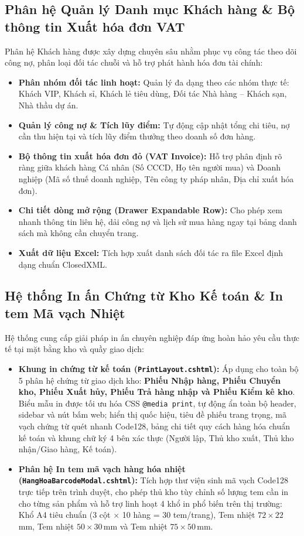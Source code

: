 \documentclass[12pt,a4paper]{report}
\renewcommand{\_}{\textunderscore\allowbreak}
\begin{document}
\subsection{Phân hệ Quản lý Danh mục Khách hàng \& Bộ thông tin Xuất hóa đơn VAT}
Phân hệ Khách hàng được xây dựng chuyên sâu nhằm phục vụ công tác theo dõi công nợ, phân loại đối tác chuỗi và hỗ trợ phát hành hóa đơn tài chính:
\begin{itemize}
    \item \textbf{Phân nhóm đối tác linh hoạt:} Quản lý đa dạng theo các nhóm thực tế: Khách VIP, Khách sỉ, Khách lẻ tiêu dùng, Đối tác Nhà hàng -- Khách sạn, Nhà thầu dự án.
    \item \textbf{Quản lý công nợ \& Tích lũy điểm:} Tự động cập nhật tổng chi tiêu, nợ cần thu hiện tại và tích lũy điểm thưởng theo doanh số đơn hàng.
    \item \textbf{Bộ thông tin xuất hóa đơn đỏ (VAT Invoice):} Hỗ trợ phân định rõ ràng giữa khách hàng Cá nhân (Số CCCD, Họ tên người mua) và Doanh nghiệp (Mã số thuế doanh nghiệp, Tên công ty pháp nhân, Địa chỉ xuất hóa đơn).
    \item \textbf{Chi tiết dòng mở rộng (Drawer Expandable Row):} Cho phép xem nhanh thông tin liên hệ, dải công nợ và lịch sử mua hàng ngay tại bảng danh sách mà không cần chuyển trang.
    \item \textbf{Xuất dữ liệu Excel:} Tích hợp xuất danh sách đối tác ra file Excel định dạng chuẩn ClosedXML.
\end{itemize}

\subsection{Hệ thống In ấn Chứng từ Kho Kế toán \& In tem Mã vạch Nhiệt}
Hệ thống cung cấp giải pháp in ấn chuyên nghiệp đáp ứng hoàn hảo yêu cầu thực tế tại mặt bằng kho và quầy giao dịch:
\begin{itemize}
    \item \textbf{Khung in chứng từ kế toán (\texttt{\_PrintLayout.cshtml}):} Áp dụng cho toàn bộ 5 phân hệ chứng từ giao dịch kho: \textbf{Phiếu Nhập hàng, Phiếu Chuyển kho, Phiếu Xuất hủy, Phiếu Trả hàng nhập và Phiếu Kiểm kê kho}. Biểu mẫu in được tối ưu hóa CSS \texttt{@media print}, tự động ẩn toàn bộ header, sidebar và nút bấm web; hiển thị quốc hiệu, tiêu đề phiếu trang trọng, mã vạch chứng từ quét nhanh Code128, bảng chi tiết quy cách hàng hóa chuẩn kế toán và khung chữ ký 4 bên xác thực (Người lập, Thủ kho xuất, Thủ kho nhận/Giao hàng, Kế toán).
    \item \textbf{Phân hệ In tem mã vạch hàng hóa nhiệt (\texttt{\_HangHoaBarcodeModal.cshtml}):} Tích hợp thư viện sinh mã vạch Code128 trực tiếp trên trình duyệt, cho phép thủ kho tùy chỉnh số lượng tem cần in cho từng sản phẩm và hỗ trợ linh hoạt 4 khổ in phổ biến trên thị trường: Khổ A4 tiêu chuẩn (3 cột $\times$ 10 hàng = 30 tem/trang), Tem nhiệt $72 \times 22$\,mm, Tem nhiệt $50 \times 30$\,mm và Tem nhiệt $75 \times 50$\,mm.
\end{itemize}
\end{document}
